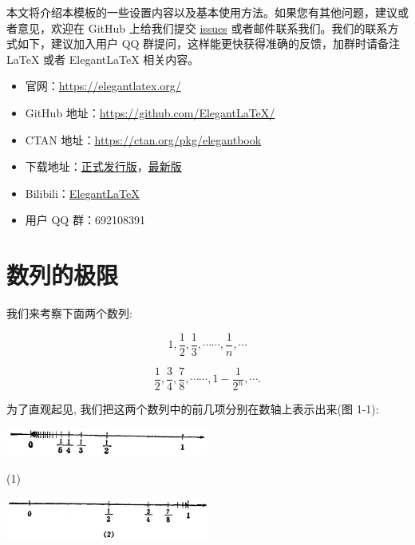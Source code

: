 \documentclass[lang=cn,newtx,10pt,scheme=chinese]{elegantbook}
\begin{document}
本文将介绍本模板的一些设置内容以及基本使用方法。如果您有其他问题，建议或者意见，欢迎在 GitHub 上给我们提交 \href{https://github.com/ElegantLaTeX/ElegantBook/issues}{issues} 或者邮件联系我们。我们的联系方式如下，建议加入用户 QQ 群提问，这样能更快获得准确的反馈，加群时请备注 \LaTeX{} 或者 Elegant\LaTeX{} 相关内容。
\begin{itemize}
	\item 官网：\href{https://elegantlatex.org/}{https://elegantlatex.org/}
	\item GitHub 地址：\href{https://github.com/ElegantLaTeX/}{https://github.com/ElegantLaTeX/}
	\item CTAN 地址：\href{https://ctan.org/pkg/elegantbook}{https://ctan.org/pkg/elegantbook}
	\item 下载地址：\href{https://github.com/ElegantLaTeX/ElegantBook/releases}{正式发行版}，\href{https://github.com/ElegantLaTeX/ElegantBook/archive/master.zip}{最新版}
	\item Bilibili：\href{https://space.bilibili.com/516479629}{ElegantLaTeX}
	\item 用户 QQ 群：692108391
\end{itemize}


\section{数列的极限}

我们来考察下面两个数列:

\[
1,\frac{1}{2},\frac{1}{3},\cdots \cdots ,\frac{1}{n},\cdots \tag{1}
\]

\[
\frac{1}{2},\frac{3}{4},\frac{7}{8},\cdots \cdots ,1 - \frac{1}{{2}^{n}},\cdots \text{.} \tag{2}
\]

为了直观起见, 我们把这两个数列中的前几项分别在数轴上表示出来(图 1-1):

\begin{center}
	\includegraphics[width=0.5\textwidth]{images/01912c18-5c3f-733d-b775-749ba9897a9d_4_159408.jpg}

\end{center}

\begin{center}
	(1)
\end{center}


\begin{center}
	\includegraphics[width=0.5\textwidth]{images/01912c18-5c3f-733d-b775-749ba9897a9d_4_459236.jpg}
\end{center}
\end{document}
